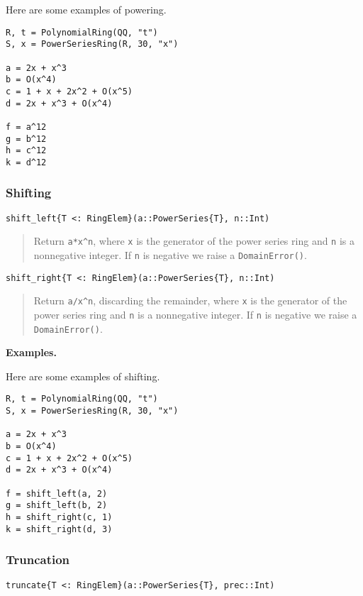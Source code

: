 \documentclass[a4paper,10pt]{article}
\newcommand{\code}{\lstinline}
\newcommand{\desc}[1]{\vspace{-3mm}\begin{quote}#1\end{quote}}
\begin{document}
Here are some examples of powering.

\begin{lstlisting}
R, t = PolynomialRing(QQ, "t")
S, x = PowerSeriesRing(R, 30, "x")

a = 2x + x^3
b = O(x^4)
c = 1 + x + 2x^2 + O(x^5)
d = 2x + x^3 + O(x^4)

f = a^12
g = b^12
h = c^12
k = d^12
\end{lstlisting}

\subsubsection{Shifting}

\begin{lstlisting}
shift_left{T <: RingElem}(a::PowerSeries{T}, n::Int)
\end{lstlisting}

\desc{Return \code{a*x^n}, where \code{x} is the generator of the power series
ring and \code{n} is a nonnegative integer. If \code{n} is negative we raise
a \code{DomainError()}.}

\begin{lstlisting}
shift_right{T <: RingElem}(a::PowerSeries{T}, n::Int)
\end{lstlisting}

\desc{Return \code{a/x^n}, discarding the remainder, where \code{x} is the
generator of the power series ring and \code{n} is a nonnegative integer. If 
\code{n} is negative we raise a \code{DomainError()}.}

\textbf{Examples.}

Here are some examples of shifting.

\begin{lstlisting}
R, t = PolynomialRing(QQ, "t")
S, x = PowerSeriesRing(R, 30, "x")

a = 2x + x^3
b = O(x^4)
c = 1 + x + 2x^2 + O(x^5)
d = 2x + x^3 + O(x^4)

f = shift_left(a, 2)
g = shift_left(b, 2)
h = shift_right(c, 1)
k = shift_right(d, 3)
\end{lstlisting}

\subsubsection{Truncation}

\begin{lstlisting}
truncate{T <: RingElem}(a::PowerSeries{T}, prec::Int)
\end{lstlisting}
\end{document}
